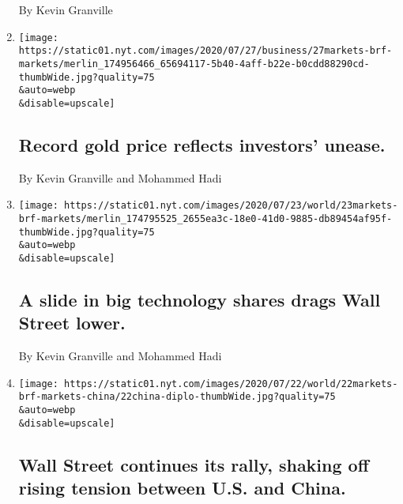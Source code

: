 \begin{enumerate}
  By Kevin Granville
\item
  \href{/live/2020/07/27/business/stock-market-today-coronavirus/record-gold-price-reflects-investors-unease}{}

  \texttt{[image: https://static01.nyt.com/images/2020/07/27/business/27markets-brf-markets/merlin\_174956466\_65694117-5b40-4aff-b22e-b0cdd88290cd-thumbWide.jpg?quality=75\\\&auto=webp\\\&disable=upscale]}

  \hypertarget{record-gold-price-reflects-investors-unease}{%
  \subsection{Record gold price reflects investors'
  unease.}\label{record-gold-price-reflects-investors-unease}}

  By Kevin Granville and Mohammed Hadi
\item
  \href{/live/2020/07/23/business/stock-market-today-coronavirus/a-slide-in-big-technology-shares-drags-wall-street-lower}{}

  \texttt{[image: https://static01.nyt.com/images/2020/07/23/world/23markets-brf-markets/merlin\_174795525\_2655ea3c-18e0-41d0-9885-db89454af95f-thumbWide.jpg?quality=75\\\&auto=webp\\\&disable=upscale]}

  \hypertarget{a-slide-in-big-technology-shares-drags-wall-street-lower}{%
  \subsection{A slide in big technology shares drags Wall Street
  lower.}\label{a-slide-in-big-technology-shares-drags-wall-street-lower}}

  By Kevin Granville and Mohammed Hadi
\item
  \href{/live/2020/07/22/business/stock-market-today-coronavirus/wall-street-continues-its-rally-shaking-off-rising-tension-between-us-and-china}{}

  \texttt{[image: https://static01.nyt.com/images/2020/07/22/world/22markets-brf-markets-china/22china-diplo-thumbWide.jpg?quality=75\\\&auto=webp\\\&disable=upscale]}

  \hypertarget{wall-street-continues-its-rally-shaking-off-rising-tension-between-us-and-china}{%
  \subsection{Wall Street continues its rally, shaking off rising
  tension between U.S. and
  China.}\label{wall-street-continues-its-rally-shaking-off-rising-tension-between-us-and-china}}


\end{enumerate}
